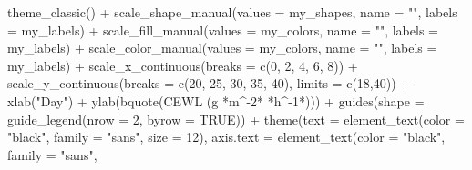 \documentclass[
]{article}
\newenvironment{Shaded}{\begin{snugshade}}{\end{snugshade}}
\newcommand{\AttributeTok}[1]{\textcolor[rgb]{0.77,0.63,0.00}{#1}}
\newcommand{\ConstantTok}[1]{\textcolor[rgb]{0.00,0.00,0.00}{#1}}
\newcommand{\DecValTok}[1]{\textcolor[rgb]{0.00,0.00,0.81}{#1}}
\newcommand{\FunctionTok}[1]{\textcolor[rgb]{0.00,0.00,0.00}{#1}}
\newcommand{\NormalTok}[1]{#1}
\newcommand{\SpecialCharTok}[1]{\textcolor[rgb]{0.00,0.00,0.00}{#1}}
\newcommand{\StringTok}[1]{\textcolor[rgb]{0.31,0.60,0.02}{#1}}
\begin{document}
\begin{Shaded}
\begin{Highlighting}[]
  \FunctionTok{theme\_classic}\NormalTok{() }\SpecialCharTok{+} 
  \FunctionTok{scale\_shape\_manual}\NormalTok{(}\AttributeTok{values =}\NormalTok{ my\_shapes, }\AttributeTok{name =} \StringTok{""}\NormalTok{,}
                     \AttributeTok{labels =}\NormalTok{ my\_labels) }\SpecialCharTok{+}
  \FunctionTok{scale\_fill\_manual}\NormalTok{(}\AttributeTok{values =}\NormalTok{ my\_colors, }\AttributeTok{name =} \StringTok{""}\NormalTok{,}
                     \AttributeTok{labels =}\NormalTok{ my\_labels) }\SpecialCharTok{+}
  \FunctionTok{scale\_color\_manual}\NormalTok{(}\AttributeTok{values =}\NormalTok{ my\_colors, }\AttributeTok{name =} \StringTok{""}\NormalTok{,}
                     \AttributeTok{labels =}\NormalTok{ my\_labels) }\SpecialCharTok{+}
  \FunctionTok{scale\_x\_continuous}\NormalTok{(}\AttributeTok{breaks =} \FunctionTok{c}\NormalTok{(}\DecValTok{0}\NormalTok{, }\DecValTok{2}\NormalTok{, }\DecValTok{4}\NormalTok{, }\DecValTok{6}\NormalTok{, }\DecValTok{8}\NormalTok{)) }\SpecialCharTok{+}
  \FunctionTok{scale\_y\_continuous}\NormalTok{(}\AttributeTok{breaks =} \FunctionTok{c}\NormalTok{(}\DecValTok{20}\NormalTok{, }\DecValTok{25}\NormalTok{, }\DecValTok{30}\NormalTok{, }\DecValTok{35}\NormalTok{, }\DecValTok{40}\NormalTok{),}
                     \AttributeTok{limits =} \FunctionTok{c}\NormalTok{(}\DecValTok{18}\NormalTok{,}\DecValTok{40}\NormalTok{)) }\SpecialCharTok{+}
  \FunctionTok{xlab}\NormalTok{(}\StringTok{"Day"}\NormalTok{) }\SpecialCharTok{+} 
  \FunctionTok{ylab}\NormalTok{(}\FunctionTok{bquote}\NormalTok{(}\StringTok{\textquotesingle{}CEWL (g \textquotesingle{}}\SpecialCharTok{*}\NormalTok{m}\SpecialCharTok{\^{}{-}}\DecValTok{2}\SpecialCharTok{*}\StringTok{\textquotesingle{} \textquotesingle{}}\SpecialCharTok{*}\NormalTok{h}\SpecialCharTok{\^{}{-}}\DecValTok{1}\SpecialCharTok{*}\StringTok{\textquotesingle{})\textquotesingle{}}\NormalTok{)) }\SpecialCharTok{+} 
  \FunctionTok{guides}\NormalTok{(}\AttributeTok{shape =} \FunctionTok{guide\_legend}\NormalTok{(}\AttributeTok{nrow =} \DecValTok{2}\NormalTok{, }\AttributeTok{byrow =} \ConstantTok{TRUE}\NormalTok{)) }\SpecialCharTok{+}
  \FunctionTok{theme}\NormalTok{(}\AttributeTok{text =} \FunctionTok{element\_text}\NormalTok{(}\AttributeTok{color =} \StringTok{"black"}\NormalTok{, }
                            \AttributeTok{family =} \StringTok{"sans"}\NormalTok{, }
                            \AttributeTok{size =} \DecValTok{12}\NormalTok{),}
        \AttributeTok{axis.text =} \FunctionTok{element\_text}\NormalTok{(}\AttributeTok{color =} \StringTok{"black"}\NormalTok{, }
                                 \AttributeTok{family =} \StringTok{"sans"}\NormalTok{, }

\end{Highlighting}
\end{Shaded}
\end{document}
